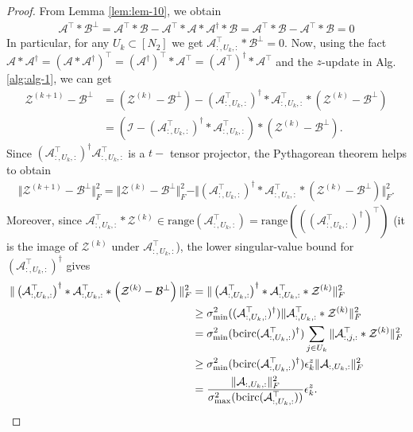 \documentclass[11pt]{article}
\newcommand{\ran}{\mathrm{range}}
\def\fm#1{\mathcal{#1}}
\def \a#1{\fm A_{:, #1, :}}
\begin{document}
\begin{proof}
From Lemma \ref{lem:lem-10}, we obtain 
\begin{align*}
    \fm A^\top *\fm B^\perp  =\fm A^\top  *\fm B - \fm A^\top * \fm A * \fm A^\dagger * \fm B =\fm A ^\top * \fm B  - \fm A ^\top * \fm B = 0
\end{align*}
In particular, for any $U_k \subset [N_2]$   we get $\fm A_{:, U_k, :}^\top *\fm B^\perp = 0$.
Now, using the fact $\fm A * \fm A^\dagger = \left(\fm A * \fm  A^\dagger \right)^\top = (\fm A^\dagger)^\top * \fm A ^\top = (\fm A^\top )^\dagger * \fm A^\top   $  and the $z$-update in Alg. \ref{alg:alg-1}, we can get
\begin{align*}
    \fm Z^{(k+1)} - \fm B^\perp  & = \left(\fm Z^{(k)} - \fm B^\perp\right) - \left(\fm A^\top_{:, {U_k}, :} \right)^\dagger* \fm A^\top_{:, U_k, :} *\left( \fm Z ^{(k)}-\fm B^\perp \right)\\
    & = \left(\fm I - \left( \a{U_k}^\top\right) ^\dagger * \a{U_k}^\top\right)*\left( \fm Z^{(k)}- \fm B^\perp \right).
\end{align*}
Since $\left( \a{U_k}^\top\right) ^\dagger \a{U_k}^\top$  is a $t-$ tensor projector,  the Pythagorean theorem helps to obtain
\begin{align}
    \Vert   \fm Z^{(k+1)} - \fm B^\perp  \Vert_F^2  = \Vert  \fm Z^{(k)} - \fm B^\perp  \Vert_F^2 - \Vert  \left(\fm A^\top_{:, {U_k}, :} \right)^\dagger* \fm A^\top_{:, U_k, :} *\left( \fm Z ^{(k)}-\fm B^\perp \right) \Vert_F^2. \label{eq:eq-1b}
\end{align}
Moreover, since $\a{U_k}^\top * \fm Z^{(k)} \in \ran(\a{U_k}^\top) = \ran\!\left(((\a{U_k}^\top)^\dagger)^\top\right)$ (it is the image of $\fm Z^{(k)}$ under $\a{U_k}^\top$), the lower singular-value bound for $(\a{U_k}^\top)^\dagger$ gives
\begin{align}
    \Vert \left(\a{U_k}^\top \right)^\dagger * \a{U_k}^\top *\left(\fm Z^{(k)}-\fm B^\perp \right) \Vert_F^2 & =  \Vert \left(\a{U_k}^\top \right)^\dagger * \a{U_k}^\top *\fm Z^{(k)}\Vert_F^2 \notag\\
    & \geq \sigma_{\min}^2((\a{U_k}^\top) ^\dagger)\Vert \a{U_k}^\top * \fm Z^{(k)} \Vert_F^2 \notag\\
    & = \sigma_{\min}^2(\bcirc(\a{U_k}^\top) ^\dagger) \sum_{j\in U_k} \Vert \a j ^\top * \fm Z^{(k)} \Vert_F^2 \notag\\
    & \geq \sigma_{\min}^2(\bcirc(\a{U_k}^\top) ^\dagger) \epsilon^z_k \Vert \a{U_k} \Vert_F^2 \notag\\
    & =  \frac{\Vert \a{U_k} \Vert_F^2}{\sigma_{\max}^2(\bcirc(\a{U_k}^\top))} \epsilon_k^z .\label{eq:eq-2}

\end{align}
\end{proof}
\end{document}
